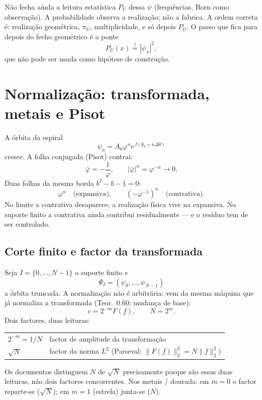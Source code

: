 \documentclass[11pt,a4paper]{article}
\begin{document}
Não fecha ainda a leitura estatística $P_U$ dessa $\psi$ (frequências, Born como observação).
A probabilidade observa a realização; não a fabrica. A ordem correta é: realização geométrica,
$\pi_U$, multiplicidade, e só depois $P_U$. O passo que fica para depois do fecho geométrico é a ponte
\[
P_U(x)\stackrel{?}{=}|\psi_x|^2,
\]
que não pode ser usada como hipótese de construção.


\section{Normalização: transformada, metais e Pisot}
\label{sec:norm}

A órbita da espiral
\[
\psi_n=A_0\varphi^n e^{J(\theta_0+n\Delta\theta)}
\]
cresce. A folha conjugada (Pisot) contrai:
\[
\bar\varphi=-\frac1\varphi,\qquad
\bigl|\bar\varphi\bigr|^n=\varphi^{-n}\to 0.
\]
Duas folhas da mesma borda $b^2-b-1=0$:
\[
\varphi^n\quad\text{(expansiva)},\qquad
(-\varphi^{-1})^n\quad\text{(contrativa)}.
\]
No limite a contrativa desaparece; a realização física vive na expansiva.
No suporte finito a contrativa ainda contribui residualmente --- e o resíduo tem de
ser controlado.

\subsection{Corte finito e factor da transformada}

Seja $I=\{0,\ldots,N-1\}$ o suporte finito e
\[
\Psi_I=(\psi_0,\ldots,\psi_{N-1})
\]
a órbita truncada. A normalização não é arbitrária: vem da mesma máquina que já
normaliza a transformada (Teor.~0.60; mudança de base):
\[
c=2^{-m}F(f),\qquad N=2^m.
\]
Dois factores, duas leituras:
\begin{center}
\renewcommand{\arraystretch}{1.2}
\begin{tabular}{@{}ll@{}}
$2^{-m}=1/N$ & factor de amplitude da transformação \\
$\sqrt N$ & factor da norma $L^2$ (Parseval: $\|F(f)\|_2^2=N\|f\|_2^2$) \\
\end{tabular}
\end{center}
Os documentos distinguem $N$ de $\sqrt N$ precisamente porque são essas duas leituras,
não dois factores concorrentes. Nos metais / dourada: em $m=0$ o factor reparte-se
($\sqrt N$); em $m=1$ (estrela) junta-se ($N$).
\end{document}
